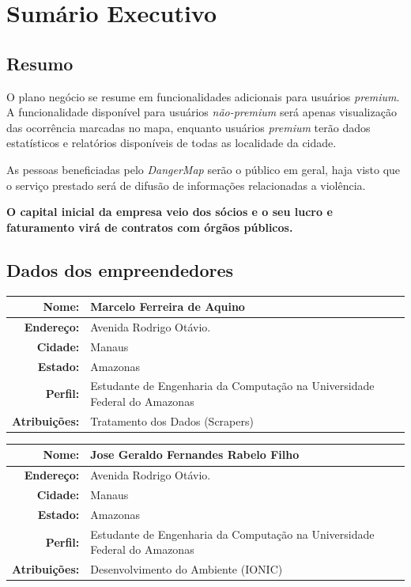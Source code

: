 \documentclass[
	12pt,				%
	openright,			%
	twoside,			%
	a4paper,			%
	english,			%
	french,				%
	spanish,			%
	brazil,				%
	]{abntex2}
\begin{document}
\chapter{Sumário Executivo}


\section{Resumo}

O plano negócio se resume em funcionalidades adicionais para usuários \textit{premium}. A funcionalidade disponível para usuários \textit{não-premium} será apenas visualização das ocorrência marcadas no mapa, enquanto usuários \textit{premium} terão dados  estatísticos e relatórios disponíveis de todas as localidade da cidade.

As pessoas beneficiadas pelo \textit{DangerMap} serão o público em geral, haja visto que o serviço prestado será de difusão de informações relacionadas a violência. 

\textbf{O capital inicial da empresa veio dos sócios e o seu lucro e faturamento virá de contratos com órgãos públicos.}


\section{Dados dos empreendedores}

\begin{center}
	\begin{tabular}{|r|p{12cm}|}
		\hline
		\textbf{Nome:}		& Marcelo Ferreira de Aquino \\ \hline
		\textbf{Endereço:}	& Avenida Rodrigo Otávio. \\ \hline
		\textbf{Cidade:}	& Manaus \\ \hline
		\textbf{Estado:}	& Amazonas \\ \hline
		\textbf{Perfil:}	& Estudante de Engenharia da Computação na Universidade Federal do Amazonas\\ \hline
		\textbf{Atribuições:}	& Tratamento dos Dados (Scrapers) \\ \hline
	\end{tabular}
\end{center}

\begin{center}
	\begin{tabular}{|r|p{12cm}|}
		\hline
		\textbf{Nome:}		& Jose Geraldo Fernandes Rabelo Filho \\ \hline
		\textbf{Endereço:}	& Avenida Rodrigo Otávio. \\ \hline
		\textbf{Cidade:}	& Manaus \\ \hline
		\textbf{Estado:}	& Amazonas \\ \hline
		\textbf{Perfil:}	& Estudante de Engenharia da Computação na Universidade Federal do Amazonas\\ \hline
		\textbf{Atribuições:}	& Desenvolvimento do Ambiente (IONIC) \\ \hline
	\end{tabular}
\end{center}
\end{document}
